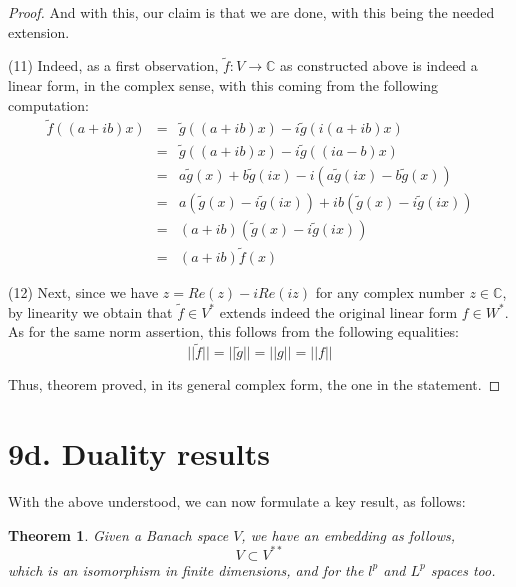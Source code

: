 \documentclass[12pt]{amsbook}
\newtheorem{theorem}{Theorem}[chapter]
\begin{document}
\begin{proof}
And with this, our claim is that we are done, with this being the needed extension. 

\medskip

(11) Indeed, as a first observation, $\tilde{f}:V\to\mathbb C$ as constructed above is indeed a linear form, in the complex sense, with this coming from the following computation:
\begin{eqnarray*}
\tilde{f}((a+ib) x)
&=&\tilde{g}((a+ib)x)-i\tilde{g}(i(a+ib)x)\\
&=&\tilde{g}((a+ib)x)-i\tilde{g}((ia-b)x)\\
&=&a\tilde{g}(x)+b\tilde{g}(ix)-i(a\tilde{g}(ix)-b\tilde{g}(x))\\
&=&a(\tilde{g}(x)-i\tilde{g}(ix))+ib(\tilde{g}(x)-i\tilde{g}(ix))\\
&=&(a+ib)(\tilde{g}(x)-i\tilde{g}(ix))\\
&=&(a+ib)\tilde{f}(x)
\end{eqnarray*}

(12) Next, since we have $z=Re(z)-iRe(iz)$ for any complex number $z\in\mathbb C$, by linearity we obtain that $\tilde{f}\in V^*$ extends indeed the original linear form $f\in W^*$. As for the same norm assertion, this follows from the following equalities:
$$||\tilde{f}||=||\tilde{g}||=||g||=||f||$$

Thus, theorem proved, in its general complex form, the one in the statement.
\end{proof}

\section*{9d. Duality results} 

With the above understood, we can now formulate a key result, as follows:


\begin{theorem}
Given a Banach space $V$, we have an embedding as follows,
$$V\subset V^{**}$$
which is an isomorphism in finite dimensions, and for the $l^p$ and $L^p$ spaces too. 
\end{theorem}
\end{document}
